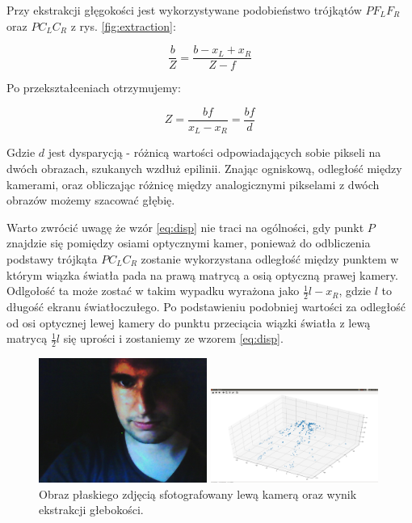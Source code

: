 \documentclass{article}
\begin{document}
Przy ekstrakcji głęgokości jest wykorzystywane podobieństwo trójkątów $P F_L F_R$ oraz $P C_L C_R$ z rys. \ref{fig:extraction}:

\begin{equation}
	\frac{b}{Z} = \frac{b-x_L+x_R}{Z-f}
	\label{eq:disp}
\end{equation}

Po przekształceniach otrzymujemy:

\begin{equation}
	Z = \frac{bf}{x_L-x_R} = \frac{bf}{d}
\end{equation}

Gdzie $d$ jest dysparycją - różnicą wartości odpowiadających sobie pikseli na dwóch obrazach, szukanych wzdłuż epilinii.
Znając ogniskową, odległość między kamerami, oraz obliczając różnicę między analogicznymi pikselami z dwóch obrazów możemy szacować głębię.

Warto zwrócić uwagę że wzór \ref{eq:disp} nie traci na ogólności, gdy punkt $P$ znajdzie się pomiędzy osiami optycznymi kamer, ponieważ do odbliczenia podstawy trójkąta $P C_L C_R$ zostanie wykorzystana odległość między punktem w którym wiązka światła pada na prawą matrycą a osią optyczną prawej kamery. Odlgołość ta może zostać w takim wypadku wyrażona jako $\frac{1}{2}l-x_R$, gdzie $l$ to długość ekranu światłoczułego. Po podstawieniu podobniej wartości za odległość od osi optycznej lewej kamery do punktu przeciącia wiązki światła z lewą matrycą $\frac{1}{2}l$ się uprości i zostaniemy ze wzorem \ref{eq:disp}.

\begin{figure}
	\centering
	\begin{minipage}{5.5cm}
		\includegraphics[width=5.5cm]{falt_test_face1L.jpg}
	\end{minipage}
	\begin{minipage}{5.5cm}
		\includegraphics[width=5.5cm]{result_fail.png}
	\end{minipage}		
	\caption{Obraz płaskiego zdjęcią sfotografowany lewą kamerą oraz wynik ekstrakcji głebokości. }
	\label{fig:extraction_fail}
\end{figure}
\end{document}
